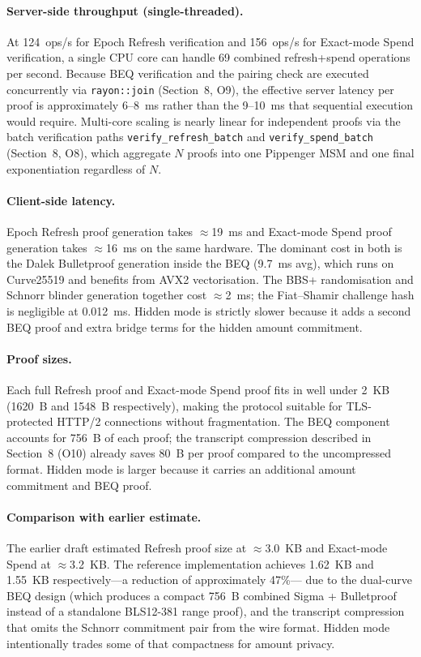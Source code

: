 \documentclass[11pt]{article}
\theoremstyle{definitionstyle}
\theoremstyle{plain}
\begin{document}
\paragraph{Server-side throughput (single-threaded).}
At 124~ops/s for Epoch Refresh verification and 156~ops/s for Exact-mode Spend
verification, a single CPU core can handle 69 combined refresh+spend
operations per second.  Because BEQ verification and the pairing check
are executed concurrently via \texttt{rayon::join} (Section~8, O9), the
effective server latency per proof is approximately 6--8~ms rather than
the 9--10~ms that sequential execution would require.  Multi-core scaling
is nearly linear for independent proofs via the batch verification paths
\texttt{verify\_refresh\_batch} and \texttt{verify\_spend\_batch}
(Section~8, O8), which aggregate $N$ proofs into one Pippenger MSM and
one final exponentiation regardless of $N$.

\paragraph{Client-side latency.}
Epoch Refresh proof generation takes $\approx$19~ms and Exact-mode Spend proof
generation takes $\approx$16~ms on the same hardware.  The dominant cost
in both is the Dalek Bulletproof generation inside the BEQ (9.7~ms avg),
which runs on Curve25519 and benefits from AVX2 vectorisation.  The
BBS+ randomisation and Schnorr blinder generation together cost
$\approx$2~ms; the Fiat--Shamir challenge hash is negligible at 0.012~ms.
Hidden mode is strictly slower because it adds a second BEQ proof and extra
bridge terms for the hidden amount commitment.

\paragraph{Proof sizes.}
Each full Refresh proof and Exact-mode Spend proof fits in well under 2~KB
(1620~B and 1548~B respectively), making the protocol suitable for TLS-protected
HTTP/2 connections without fragmentation.  The BEQ component accounts
for 756~B of each proof; the transcript compression described in
Section~8 (O10) already saves 80~B per proof compared to the
uncompressed format.  Hidden mode is larger because it carries an additional
amount commitment and BEQ proof.

\paragraph{Comparison with earlier estimate.}
The earlier draft estimated Refresh proof size at $\approx$3.0~KB and
Exact-mode Spend at $\approx$3.2~KB.  The reference implementation achieves
1.62~KB and 1.55~KB respectively—a reduction of approximately 47\%—
due to the dual-curve BEQ design (which produces a compact 756~B
combined Sigma + Bulletproof instead of a standalone BLS12-381 range
proof), and the transcript compression that omits the Schnorr
commitment pair from the wire format.  Hidden mode intentionally trades some
of that compactness for amount privacy.
\end{document}
